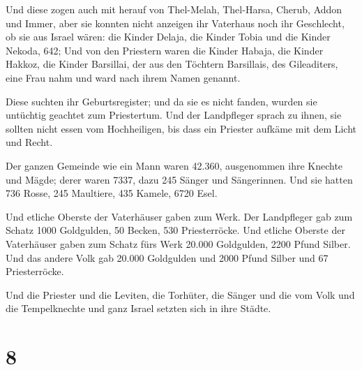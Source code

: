  Und diese zogen auch mit herauf von Thel-Melah,
Thel-Harsa, Cherub, Addon und Immer, aber sie konnten nicht anzeigen ihr
Vaterhaus noch ihr Geschlecht, ob sie aus Israel wären: 
die Kinder Delaja, die Kinder Tobia und die Kinder Nekoda, 642;
 Und von den Priestern waren die Kinder Habaja, die
Kinder Hakkoz, die Kinder Barsillai, der aus den Töchtern Barsillais,
des Gileaditers, eine Frau nahm und ward nach ihrem Namen genannt.

 Diese suchten ihr Geburtsregister; und da sie es nicht
fanden, wurden sie untüchtig geachtet zum Priestertum. 
Und der Landpfleger sprach zu ihnen, sie sollten nicht essen vom
Hochheiligen, bis dass ein Priester aufkäme mit dem Licht und Recht.

 Der ganzen Gemeinde wie ein Mann waren 42.360,
 ausgenommen ihre Knechte und Mägde; derer waren 7337,
dazu 245 Sänger und Sängerinnen.  Und sie hatten 736
Rosse, 245 Maultiere,  435 Kamele, 6720 Esel.

 Und etliche Oberste der Vaterhäuser gaben zum Werk. Der
Landpfleger gab zum Schatz 1000 Goldgulden, 50 Becken, 530
Priesterröcke.  Und etliche Oberste der Vaterhäuser gaben
zum Schatz fürs Werk 20.000 Goldgulden, 2200 Pfund Silber.
 Und das andere Volk gab 20.000 Goldgulden und 2000 Pfund
Silber und 67 Priesterröcke.

 Und die Priester und die Leviten, die Torhüter, die
Sänger und die vom Volk und die Tempelknechte und ganz Israel setzten
sich in ihre Städte.

\hypertarget{section-7}{%
\section{8}\label{section-7}}

